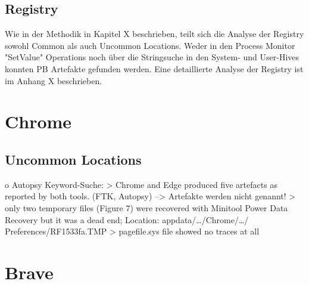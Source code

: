 %

\subsection*{Registry}

Wie in der Methodik in Kapitel X beschrieben, teilt sich die Analyse der Registry sowohl Common als auch Uncommon Locations. Weder in den Process Monitor "SetValue" Operations noch über die Stringsuche in den System- und User-Hives konnten PB Artefakte gefunden werden. Eine detaillierte Analyse der Registry ist im Anhang X beschrieben. 

\section{Chrome}

\subsection*{Uncommon Locations}

o Autopsy Keyword-Suche: 
	> Chrome and Edge produced five artefacts as reported by both tools. (FTK, Autopsy) \cite{Gabet.2018}
		--> Artefakte werden nicht genannt!
	> only two temporary files (Figure 7) were recovered with Minitool Power Data Recovery but it was a dead end; Location: appdata/…/Chrome/…/ Preferences/RF1533fa.TMP \cite{Fayyad.2021}
	> pagefile.sys file showed no traces at all \cite{Said.2011}
	

\section{Brave}